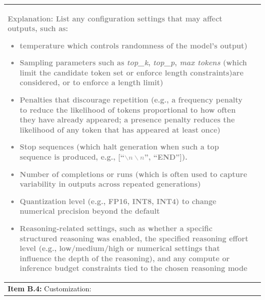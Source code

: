 \documentclass[12pt]{article}
\begin{document}
\begin{longtable}{|p{}|p{}|}
\textcolor{gray}{{\footnotesize
\textbf{Explanation:} List any configuration settings that may affect outputs, such as:
\begin{itemize}[leftmargin=*]\setlength{\itemsep}{0pt}\setlength{\parskip}{0pt}
    \item \textbf{temperature} which controls randomness of the model’s output)
    \item \textbf{Sampling parameters} such as \emph{top\_k}, \emph{top\_p}, \emph{max tokens} (which limit the candidate token set or enforce length constraints)are considered, or to enforce a length limit)
    \item \textbf{Penalties} that discourage repetition (e.g., a frequency penalty to reduce the likelihood of tokens proportional to how often they have already appeared; a presence penalty reduces the likelihood of any token that has appeared at least once) 
    \item \textbf{Stop sequences} (which halt generation when such a top sequence is produced, e.g., [``$\backslash n \backslash n$'', ``END'']).
    \item \textbf{Number of completions or runs} (which is often used to capture variability in outputs across repeated generations)
    \item \textbf{Quantization level} (e.g., FP16, INT8, INT4) to change numerical precision beyond the default
    \item \textbf{Reasoning-related settings}, such as whether a specific structured reasoning was enabled, the specified reasoning effort level (e.g., low/medium/high or numerical settings that influence the depth of the reasoning), and any compute or inference budget constraints tied to the chosen reasoning mode
\end{itemize}
} } &   \\
\hline
\textbf{Item B.4:} Customization: 


\end{longtable}
\end{document}

